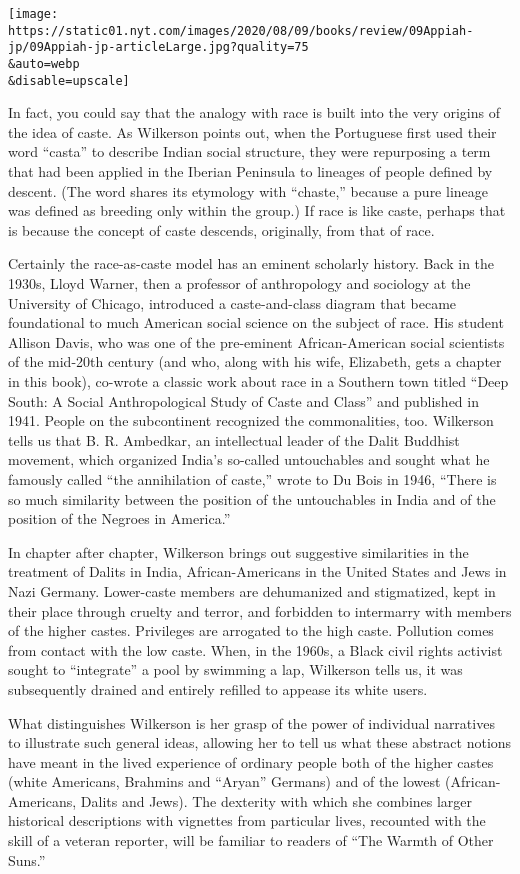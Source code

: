 \texttt{[image: https://static01.nyt.com/images/2020/08/09/books/review/09Appiah-jp/09Appiah-jp-articleLarge.jpg?quality=75\\\&auto=webp\\\&disable=upscale]}

In fact, you could say that the analogy with race is built into the very
origins of the idea of caste. As Wilkerson points out, when the
Portuguese first used their word ``casta'' to describe Indian social
structure, they were repurposing a term that had been applied in the
Iberian Peninsula to lineages of people defined by descent. (The word
shares its etymology with ``chaste,'' because a pure lineage was defined
as breeding only within the group.) If race is like caste, perhaps that
is because the concept of caste descends, originally, from that of race.

Certainly the race-as-caste model has an eminent scholarly history. Back
in the 1930s, Lloyd Warner, then a professor of anthropology and
sociology at the University of Chicago, introduced a caste-and-class
diagram that became foundational to much American social science on the
subject of race. His student Allison Davis, who was one of the
pre-eminent African-American social scientists of the mid-20th century
(and who, along with his wife, Elizabeth, gets a chapter in this book),
co-wrote a classic work about race in a Southern town titled ``Deep
South: A Social Anthropological Study of Caste and Class'' and published
in 1941. People on the subcontinent recognized the commonalities, too.
Wilkerson tells us that B. R. Ambedkar, an intellectual leader of the
Dalit Buddhist movement, which organized India's so-called untouchables
and sought what he famously called ``the annihilation of caste,'' wrote
to Du Bois in 1946, ``There is so much similarity between the position
of the untouchables in India and of the position of the Negroes in
America.''

In chapter after chapter, Wilkerson brings out suggestive similarities
in the treatment of Dalits in India, African-Americans in the United
States and Jews in Nazi Germany. Lower-caste members are dehumanized and
stigmatized, kept in their place through cruelty and terror, and
forbidden to intermarry with members of the higher castes. Privileges
are arrogated to the high caste. Pollution comes from contact with the
low caste. When, in the 1960s, a Black civil rights activist sought to
``integrate'' a pool by swimming a lap, Wilkerson tells us, it was
subsequently drained and entirely refilled to appease its white users.

What distinguishes Wilkerson is her grasp of the power of individual
narratives to illustrate such general ideas, allowing her to tell us
what these abstract notions have meant in the lived experience of
ordinary people both of the higher castes (white Americans, Brahmins and
``Aryan'' Germans) and of the lowest (African-Americans, Dalits and
Jews). The dexterity with which she combines larger historical
descriptions with vignettes from particular lives, recounted with the
skill of a veteran reporter, will be familiar to readers of ``The Warmth
of Other Suns.''

